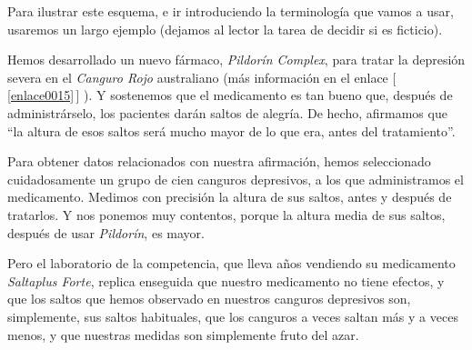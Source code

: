 Para ilustrar este esquema, e ir introduciendo la terminología que vamos a usar, usaremos un largo ejemplo (dejamos al lector la tarea de decidir si es ficticio).

\begin{ejemplo}\label{cap07:ejem:CangurosDepresivos01}
    Hemos desarrollado un nuevo fármaco, {\em Pildorín Complex}, para tratar la depresión severa en el {\em Canguro Rojo} australiano
    (más información en el enlace [\,\ref{enlace0015}\,]\label{enlace0015a}
    ). Y sostenemos que el medicamento es tan bueno que,  después de administrárselo, los pacientes darán saltos de alegría. De hecho, afirmamos que ``la altura de esos saltos será mucho mayor de lo que era, antes del tratamiento''.

    Para obtener datos relacionados con nuestra afirmación, hemos seleccionado cuidadosamente un grupo de cien canguros depresivos, a los que administramos el medicamento. Medimos con precisión la altura de sus saltos, antes y después de tratarlos. Y nos ponemos muy contentos, porque la altura media de sus saltos, después de usar {\em Pildorín}, es mayor.

    Pero el laboratorio de la competencia, que lleva años vendiendo su medicamento {\em Saltaplus Forte}, replica enseguida que nuestro medicamento no tiene efectos, y que los saltos que hemos observado en nuestros canguros depresivos son, simplemente, sus saltos habituales, que los canguros a veces saltan más y a veces menos, y que nuestras medidas son simplemente {\sf fruto del  azar}.


\end{ejemplo}
